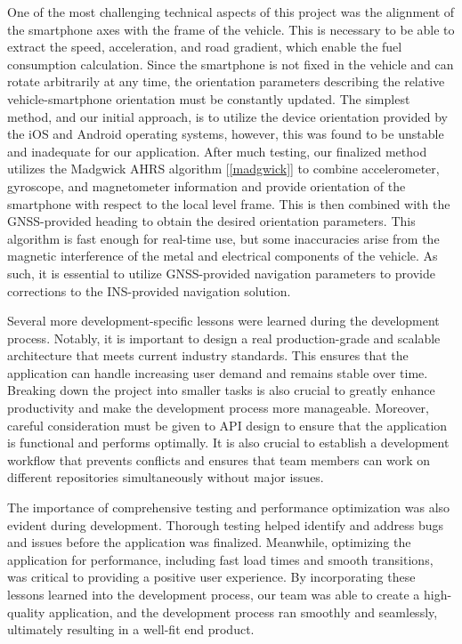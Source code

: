 \documentclass[11pt, oneside]{article}
\begin{document}
One of the most challenging technical aspects of this project was the alignment of the smartphone axes with the frame of the vehicle.  This is necessary to be able to extract the speed, acceleration, and road gradient, which enable the fuel consumption calculation.  Since the smartphone is not fixed in the vehicle and can rotate arbitrarily at any time, the orientation parameters describing the relative vehicle-smartphone orientation must be constantly updated.  The simplest method, and our initial approach, is to utilize the device orientation provided by the iOS and Android operating systems, however, this was found to be unstable and inadequate for our application.  After much testing, our finalized method utilizes the Madgwick AHRS algorithm [\ref*{madgwick}] to combine accelerometer, gyroscope, and magnetometer information and provide orientation of the smartphone with respect to the local level frame.  This is then combined with the GNSS-provided heading to obtain the desired orientation parameters.  This algorithm is fast enough for real-time use, but some inaccuracies arise from the magnetic interference of the metal and electrical components of the vehicle.  As such, it is essential to utilize GNSS-provided navigation parameters to provide corrections to the INS-provided navigation solution.

Several more development-specific lessons were learned during the development process. Notably, it is important to design a real production-grade and scalable architecture that meets current industry standards. This ensures that the application can handle increasing user demand and remains stable over time. Breaking down the project into smaller tasks is also crucial to greatly enhance productivity and make the development process more manageable. Moreover, careful consideration must be given to API design to ensure that the application is functional and performs optimally. It is also crucial to establish a development workflow that prevents conflicts and ensures that team members can work on different repositories simultaneously without major issues. 

The importance of comprehensive testing and performance optimization was also evident during development. Thorough testing helped identify and address bugs and issues before the application was finalized. Meanwhile, optimizing the application for performance, including fast load times and smooth transitions, was critical to providing a positive user experience. By incorporating these lessons learned into the development process, our team was able to create a high-quality application, and the development process ran smoothly and seamlessly, ultimately resulting in a well-fit end product.
\end{document}
